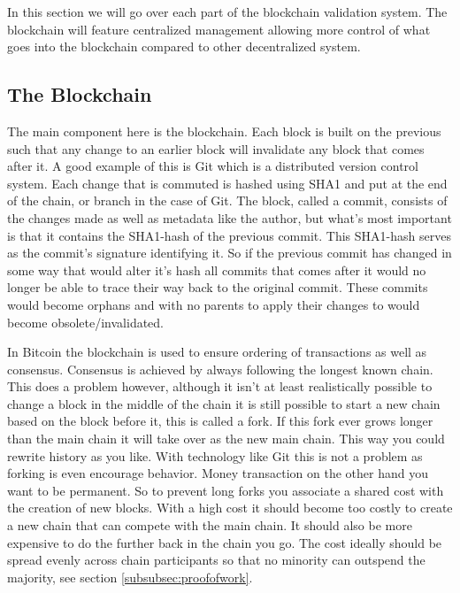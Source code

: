 \documentclass[11pt]{article}
\begin{document}
In this section we will go over each part of the blockchain validation system. The blockchain will feature centralized management allowing more control of what goes into the blockchain compared to other decentralized system.

\subsection{The Blockchain}
The main component here is the blockchain. Each block is built on the previous such that any change to an earlier block will invalidate any block that comes after it. A good example of this is Git which is a distributed version control system. Each change that is commuted is hashed using SHA1 and put at the end of the chain, or branch in the case of Git. The block, called a commit, consists of the changes made as well as metadata like the author, but what's most important is that it contains the SHA1-hash of the previous commit. This SHA1-hash serves as the commit's signature identifying it. So if the previous commit has changed in some way that would alter it's hash all commits that comes after it would no longer be able to trace their way back to the original commit. These commits would become orphans and with no parents to apply their changes to would become obsolete/invalidated.


In Bitcoin the blockchain is used to ensure ordering of transactions as well as consensus. Consensus is achieved by always following the longest known chain. This does a problem however, although it isn't at least realistically possible to change a block in the middle of the chain it is still possible to start a new chain based on the block before it, this is called a fork. If this fork ever grows longer than the main chain it will take over as the new main chain. This way you could rewrite history as you like. With technology like Git this is not a problem as forking is even encourage behavior. Money transaction on the other hand you want to be permanent. So to prevent long forks you associate a shared cost with the creation of new blocks. With a high cost it should become too costly to create a new chain that can compete with the main chain. It should also be more expensive to do the further back in the chain you go. The cost ideally should be spread evenly across chain participants so that no minority can outspend the majority, see section \ref{subsubsec:proofofwork}.
\end{document}
